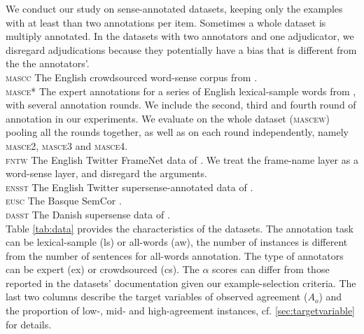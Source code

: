 \documentclass[11pt,a4paper]{article}
\begin{document}
We conduct our study on sense-annotated datasets, keeping only the examples with at least than two annotations per item. Sometimes a whole dataset is multiply annotated. In the datasets with two annotators and one adjudicator, we disregard adjudications because they potentially have a bias that is different from the the annotators'.\\
\noindent\textsc{mascc} The English crowdsourced word-sense corpus from .\\
\textsc{masce*} The expert annotations for a series of English lexical-sample words from , with several annotation rounds. We include the second, third and fourth round of annotation in our experiments. We evaluate on the whole dataset (\textsc{mascew}) pooling all the rounds together, as well as on each round independently, namely \textsc{masce2}, \textsc{masce3} and \textsc{masce4}.\\
\textsc{fntw} The English Twitter FrameNet data of . We treat the frame-name layer as a word-sense layer, and disregard the arguments.\\
\textsc{ensst} The English Twitter supersense-annotated data of .\\
\textsc{eusc} The Basque SemCor \cite{Agirre2006}.\\
\textsc{dasst} The Danish supersense data of \cite{MartinezAlonso2015}.\\
Table \ref{tab:data} provides the characteristics of the datasets. The annotation task can be lexical-sample (ls) or all-words (aw), the number of instances is different from the number of sentences for all-words annotation. The type of annotators can be expert (ex) or crowdsourced (cs). The $\alpha$ scores can differ from those reported in the datasets' documentation given our example-selection criteria. The last two columns describe the target variables of observed agreement ($A_o$) and the proportion of low-, mid- and high-agreement instances, cf. \ref{sec:targetvariable} for details.
\end{document}
